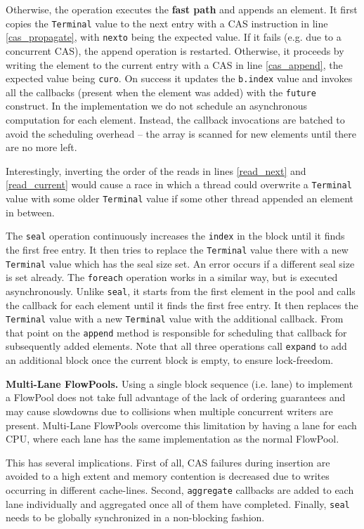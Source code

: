 \documentclass[runningheads,a4paper]{llncs}
\begin{document}
Otherwise, the operation executes the \textbf{fast path} and appends
an element.
It first copies the \verb=Terminal= value to the next entry with a CAS
instruction in line \ref{cas_propagate}, with \verb=nexto= being the
expected value. If it fails (e.g. due to a concurrent CAS), the append
operation is restarted.
Otherwise, it proceeds by writing the element to the current entry with
a CAS in line \ref{cas_append}, the expected value being
\verb=curo=.
On success it updates the \verb=b.index= value and invokes all
the callbacks (present when the element was added) with
the \verb=future= construct.
In the implementation we do not schedule an asynchronous
computation for each element.
Instead, the callback invocations are batched to avoid the scheduling overhead
-- the array is scanned for new elements
until there are no more left.

Interestingly, inverting the order of the reads in lines
\ref{read_next} and \ref{read_current} would cause a race in which a
thread could overwrite a \verb=Terminal= value with some older
\verb=Terminal= value if some other thread appended an element in between.

The \verb=seal= operation continuously increases the \verb=index= in the block
until it finds the first free entry. It then tries to replace the \verb=Terminal=
value there with a new \verb=Terminal= value which has the seal size set.
An error occurs if a different seal size is set already. The \verb=foreach=
operation works in a similar way, but is executed asynchronously. Unlike
\verb=seal=, it starts from the first element in the pool and calls the
callback for each element until it finds the first free entry.
It then replaces the \verb=Terminal= value with a new \verb=Terminal=
value with the additional callback. From that point on the \verb=append=
method is responsible for scheduling that callback for subsequently added elements.
Note that all three operations call \verb=expand= to add an additional
block once the current block is empty, to ensure lock-freedom.

\textbf{Multi-Lane FlowPools.}
Using a single block sequence (i.e. lane) to implement a FlowPool
does not take full advantage of the lack of ordering guarantees
and may cause slowdowns due to
collisions when multiple concurrent writers are present. Multi-Lane
FlowPools overcome this limitation by having a lane for each CPU, where
each lane has the same implementation as the normal FlowPool.

This has several implications. First of all, CAS failures during 
insertion are avoided to a high extent and memory contention is
decreased due to writes occurring in different cache-lines.
Second, \verb=aggregate= callbacks are added to each lane
individually and aggregated once all of them have completed.
Finally, \verb=seal= needs to be globally synchronized in a
non-blocking fashion.
\end{document}
